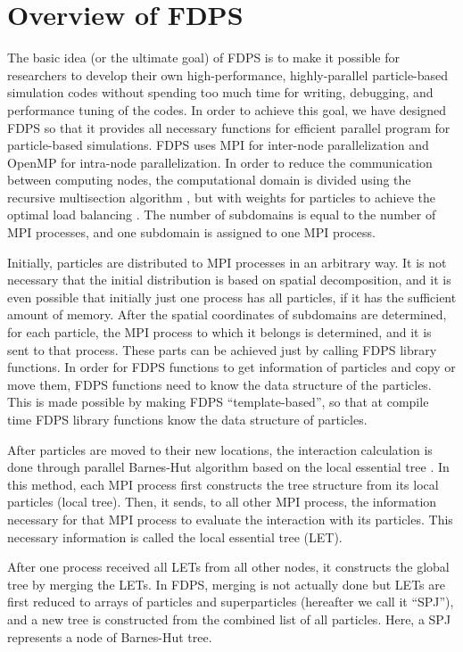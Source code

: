 \documentclass[dvipdfmx]{pasj01}
\begin{document}
\section{Overview of FDPS}

The basic idea (or the ultimate goal) of FDPS is to make it possible
for researchers to develop their own high-performance, highly-parallel
particle-based simulation codes without spending too much time for
writing, debugging, and performance tuning of the codes. In order to
achieve this goal, we have designed FDPS so that it provides all
necessary functions for efficient parallel program for particle-based
simulations. FDPS uses MPI for inter-node parallelization and OpenMP
for intra-node parallelization.  In order to reduce the communication
between computing nodes, the computational domain is divided using the
recursive multisection algorithm \citep{2004PASJ...56..521M}, but with
weights for particles to achieve the optimal load balancing
\citep{2009PASJ...61.1319I}. The number of subdomains is equal to the
number of MPI processes, and one subdomain is assigned to one MPI
process.

Initially, particles are distributed to MPI processes in an arbitrary
way. It is not necessary that the initial distribution is based on
spatial decomposition, and it is even possible that initially just one
process has all particles, if it has the sufficient amount of memory.
After the spatial coordinates of subdomains are determined, for each
particle, the MPI process to which it belongs is determined, and it is
sent to that process. These parts can be achieved just by calling FDPS
library functions. In order for FDPS functions to get information of
particles and copy or move them, FDPS functions need to know the data
structure of the particles. This is made possible by making FDPS
``template-based'', so that at compile time FDPS library functions
know the data structure of particles.

After particles are moved to their new locations, the interaction
calculation is done through parallel Barnes-Hut algorithm based on the
local essential tree \citep{2004PASJ...56..521M}.  In this method,
each MPI process first constructs the tree structure from its local
particles (local tree). Then, it sends, to all other MPI process, the
information necessary for that MPI process to evaluate the interaction
with its particles. This necessary information is called the local
essential tree (LET).

After one process received all LETs from all other nodes, it
constructs the global tree by merging the LETs. In FDPS, merging is
not actually done but LETs are first reduced to arrays of particles
and superparticles (hereafter we call it ``SPJ''), and a new tree is
constructed from the combined list of all particles. Here, a SPJ
represents a node of Barnes-Hut tree.
\end{document}
